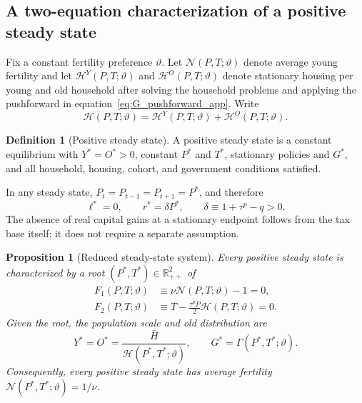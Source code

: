 \documentclass[11pt]{article}
\newtheorem{proposition}{Proposition}
\theoremstyle{definition}
\newtheorem{definition}{Definition}
\theoremstyle{remark}
\newcommand{\R}{\mathbb R}
\newcommand{\mcN}{\mathcal N}
\newcommand{\mcH}{\mathcal H}
\begin{document}
\subsection{A two-equation characterization of a positive steady state}

Fix a constant fertility preference $\vartheta$.  Let
$\mcN(P,T;\vartheta)$ denote average young fertility and let
$\mcH^Y(P,T;\vartheta)$ and $\mcH^O(P,T;\vartheta)$ denote stationary housing
per young and old household after solving the household problems and applying
the pushforward in equation~\eqref{eq:G_pushforward_app}.  Write
\begin{equation}
 \mcH(P,T;\vartheta)
 =\mcH^Y(P,T;\vartheta)+\mcH^O(P,T;\vartheta).
 \label{eq:Hsum_app}
\end{equation}

\begin{definition}[Positive steady state]
A positive steady state is a constant equilibrium with $Y^*=O^*>0$, constant
$P^*$ and $T^*$, stationary policies and $G^*$, and all household, housing,
cohort, and government conditions satisfied.
\end{definition}

In any steady state, $P_t=P_{t-1}=P_{t+1}=P^*$, and therefore
\begin{equation}
 \ell^*=0,\qquad r^*=\delta P^*,\qquad
 \delta\equiv1+\tau^p-q>0.
 \label{eq:ss_user_cost_app}
\end{equation}
The absence of real capital gains at a stationary endpoint follows from the tax
base itself; it does not require a separate assumption.

\begin{proposition}[Reduced steady-state system]
Every positive steady state is characterized by a root $(P^*,T^*)\in\R_{++}^2$
of
\begin{align}
 F_1(P,T;\vartheta)
 &\equiv\nu\mcN(P,T;\vartheta)-1=0,
 \label{eq:ss_F1}\\
 F_2(P,T;\vartheta)
 &\equiv T-\frac{\tau^pP}{2}\mcH(P,T;\vartheta)=0.
 \label{eq:ss_F2}
\end{align}
Given the root, the population scale and old distribution are
\begin{equation}
 Y^*=O^*=\frac{\bar H}{\mcH(P^*,T^*;\vartheta)},
 \qquad G^*=\Gamma(P^*,T^*;\vartheta).
 \label{eq:ss_scale_G}
\end{equation}
Consequently, every positive steady state has average fertility
$\mcN(P^*,T^*;\vartheta)=1/\nu$.
\end{proposition}
\end{document}
